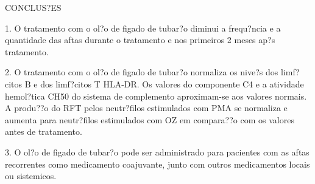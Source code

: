 \documentclass[12pt]{article}
\begin{document}
\begin{center}
\large{CONCLUS?ES}
\end{center}

 1. O tratamento com o ol?o de figado de tubar?o diminui a frequ?ncia e a
quantidade das aftas durante o tratamento e nos primeiros 2 meses ap?s
tratamento.

 2. O tratamento com o ol?o de figado de tubar?o normaliza os nive?s dos
limf?citos B e dos limf?citos T HLA-DR. Os valores do componente C4 e a
atividade hemol?tica CH50 do sistema de complemento aproximam-se aos valores
normais. A produ??o do RFT pelos neutr?filos estimulados com PMA se normaliza e
aumenta para neutr?filos estimulados com OZ em compara??o com os valores antes
de tratamento.

 3. O ol?o de figado de tubar?o pode ser administrado para pacientes com as
aftas recorrentes como medicamento coajuvante, junto com outros medicamentos
locais ou sistemicos.
\end{document}
